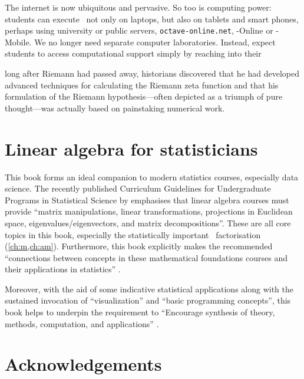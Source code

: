 The internet is now ubiquitous and pervasive. 
So too is computing power: students can execute \script\ not only on laptops, but also on tablets and smart phones, perhaps using university or public servers, \verb|octave-online.net|, \script[1]-Online or \script[1]-Mobile. 
We no longer need separate computer laboratories.
Instead, expect students to access computational support simply by reaching into their 

\begin{quoted}{\cite{Donoho2015}}
long after Riemann had passed away, historians discovered that he had developed advanced techniques for calculating the Riemann zeta function and that his formulation of the Riemann hypothesis---often depicted as a triumph of pure thought---was actually based on painstaking numerical work.
\end{quoted}







\section*{Linear algebra for statisticians}

This book forms an ideal companion to modern statistics courses, especially data science.
The recently published Curriculum Guidelines for Undergraduate Programs in Statistical Science by \cite{StatsEduGuidelines2014} emphasises that linear algebra courses must provide ``matrix manipulations, linear transformations, projections in Euclidean space, eigenvalues\slash eigenvectors, and matrix decompositions''.
These are all core topics in this book, especially the statistically 
important \svd\ factorisation (\cref{ch:m,ch:am}).
Furthermore, this book explicitly makes the recommended ``connections between concepts in these mathematical foundations courses and their applications in statistics'' \cite[p.12]{StatsEduGuidelines2014}.

Moreover, with the aid of some indicative statistical applications along with the sustained invocation of ``visualization'' and  ``basic programming concepts'', this book helps to underpin the requirement to ``Encourage synthesis of theory, methods, computation, and applications'' \cite[p.13]{StatsEduGuidelines2014}.






\section*{Acknowledgements}

